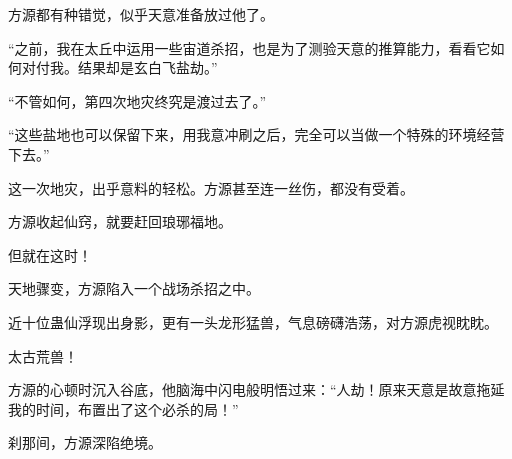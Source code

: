 \begin{this_body}
方源都有种错觉，似乎天意准备放过他了。

“之前，我在太丘中运用一些宙道杀招，也是为了测验天意的推算能力，看看它如何对付我。结果却是玄白飞盐劫。”

“不管如何，第四次地灾终究是渡过去了。”

“这些盐地也可以保留下来，用我意冲刷之后，完全可以当做一个特殊的环境经营下去。”

这一次地灾，出乎意料的轻松。方源甚至连一丝伤，都没有受着。

方源收起仙窍，就要赶回琅琊福地。

但就在这时！

天地骤变，方源陷入一个战场杀招之中。

近十位蛊仙浮现出身影，更有一头龙形猛兽，气息磅礴浩荡，对方源虎视眈眈。

太古荒兽！

方源的心顿时沉入谷底，他脑海中闪电般明悟过来：“人劫！原来天意是故意拖延我的时间，布置出了这个必杀的局！”

刹那间，方源深陷绝境。

\end{this_body}

